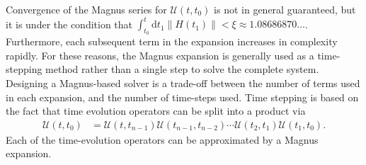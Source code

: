 \documentclass{jors}
\begin{document}

		Convergence of the Magnus series for $ \mathcal{U}(t, t_0) $ is not in general guaranteed, but it is under the condition that $ \int_{t_0}^t\mathrm{d}t_1\|H(t_1)\| < \xi \approx 1.08686870\dots $\cite{blanes_magnus_2009}.
		Furthermore, each subsequent term in the expansion increases in complexity rapidly.
		For these reasons, the Magnus expansion is generally used as a time-stepping method rather than a single step to solve the complete system.
		Designing a Magnus-based solver is a trade-off between the number of terms used in each expansion, and the number of time-steps used.
		Time stepping is based on the fact that time evolution operators can be split into a product via
		\begin{align}
			\mathcal{U}(t, t_0) &= \mathcal{U}(t, t_{n - 1})\mathcal{U}(t_{n - 1}, t_{n - 2})\cdots\mathcal{U}(t_2, t_1)\mathcal{U}(t_1, t_0).\label{eq:product_of_time_evolution}
		\end{align}
		Each of the time-evolution operators can be approximated by a Magnus expansion.

\end{document}

